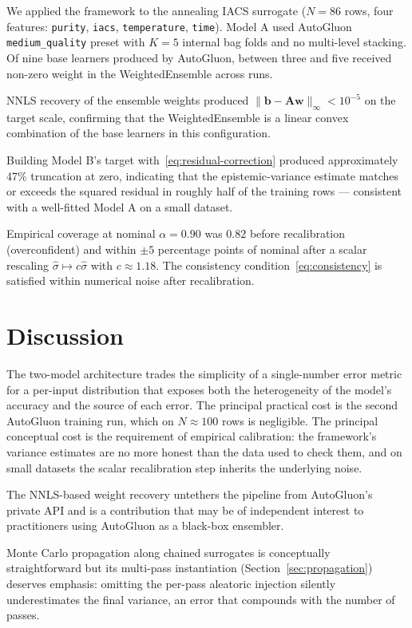 \documentclass[conference]{IEEEtran}
\begin{document}
We applied the framework to the annealing IACS surrogate ($N = 86$ rows, four features: \texttt{purity}, \texttt{iacs}, \texttt{temperature}, \texttt{time}). Model A used AutoGluon \texttt{medium\_quality} preset with $K = 5$ internal bag folds and no multi-level stacking. Of nine base learners produced by AutoGluon, between three and five received non-zero weight in the WeightedEnsemble across runs.

NNLS recovery of the ensemble weights produced $\|\bm b - \mathbf{A}\bm w\|_\infty < 10^{-5}$ on the target scale, confirming that the WeightedEnsemble is a linear convex combination of the base learners in this configuration.

Building Model B's target with~\eqref{eq:residual-correction} produced approximately 47\% truncation at zero, indicating that the epistemic-variance estimate matches or exceeds the squared residual in roughly half of the training rows --- consistent with a well-fitted Model A on a small dataset.

Empirical coverage at nominal $\alpha = 0.90$ was $0.82$ before recalibration (overconfident) and within $\pm 5$ percentage points of nominal after a scalar rescaling $\hat\sigma \mapsto c\hat\sigma$ with $c \approx 1.18$. The consistency condition~\eqref{eq:consistency} is satisfied within numerical noise after recalibration.

\section{Discussion}

The two-model architecture trades the simplicity of a single-number error metric for a per-input distribution that exposes both the heterogeneity of the model's accuracy and the source of each error. The principal practical cost is the second AutoGluon training run, which on $N \approx 100$ rows is negligible. The principal conceptual cost is the requirement of empirical calibration: the framework's variance estimates are no more honest than the data used to check them, and on small datasets the scalar recalibration step inherits the underlying noise.

The NNLS-based weight recovery untethers the pipeline from AutoGluon's private API and is a contribution that may be of independent interest to practitioners using AutoGluon as a black-box ensembler.

Monte Carlo propagation along chained surrogates is conceptually straightforward but its multi-pass instantiation (Section~\ref{sec:propagation}) deserves emphasis: omitting the per-pass aleatoric injection silently underestimates the final variance, an error that compounds with the number of passes.
\end{document}
